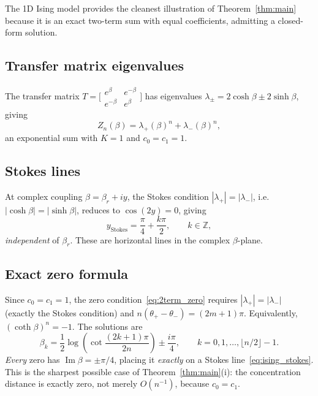 \documentclass[12pt]{article}
\theoremstyle{definition}
\theoremstyle{remark}
\newcommand{\im}{\operatorname{Im}}
\begin{document}
The 1D Ising model provides the cleanest illustration of
Theorem~\ref{thm:main} because it is an exact two-term sum with
equal coefficients, admitting a closed-form solution.

\subsection{Transfer matrix eigenvalues}

The transfer matrix $T = \bigl[\begin{smallmatrix}
e^\beta & e^{-\beta} \\ e^{-\beta} & e^\beta
\end{smallmatrix}\bigr]$ has eigenvalues
$\lambda_\pm = 2\cosh\beta \pm 2\sinh\beta$, giving
\begin{equation}\label{eq:Z_ising}
Z_n(\beta) = \lambda_+(\beta)^n + \lambda_-(\beta)^n,
\end{equation}
an exponential sum with $K = 1$ and $c_0 = c_1 = 1$.

\subsection{Stokes lines}

At complex coupling $\beta = \beta_r + iy$, the Stokes condition
$|\lambda_+| = |\lambda_-|$, i.e.\ $|\cosh\beta| = |\sinh\beta|$,
reduces to $\cos(2y) = 0$, giving
\begin{equation}\label{eq:ising_stokes}
y_{\text{Stokes}} = \frac{\pi}{4} + \frac{k\pi}{2},
\qquad k \in \mathbb{Z},
\end{equation}
\emph{independent} of $\beta_r$.  These are horizontal lines in the
complex $\beta$-plane.

\subsection{Exact zero formula}

Since $c_0 = c_1 = 1$, the zero condition~\eqref{eq:2term_zero}
requires $|\lambda_+| = |\lambda_-|$ (exactly the Stokes condition)
and $n(\theta_+ - \theta_-) = (2m+1)\pi$.  Equivalently,
$(\coth\beta)^n = -1$.  The solutions are
\begin{equation}\label{eq:ising_zeros}
\beta_k = \frac{1}{2}\log\!\left(\cot\frac{(2k{+}1)\pi}{2n}\right)
\pm \frac{i\pi}{4},
\qquad k = 0, 1, \ldots, \lfloor n/2 \rfloor - 1.
\end{equation}
\emph{Every} zero has $\im\beta = \pm\pi/4$, placing it
\emph{exactly} on a Stokes line~\eqref{eq:ising_stokes}.  This is
the sharpest possible case of Theorem~\ref{thm:main}(i): the
concentration distance is exactly zero, not merely $O(n^{-1})$,
because $c_0 = c_1$.
\end{document}

